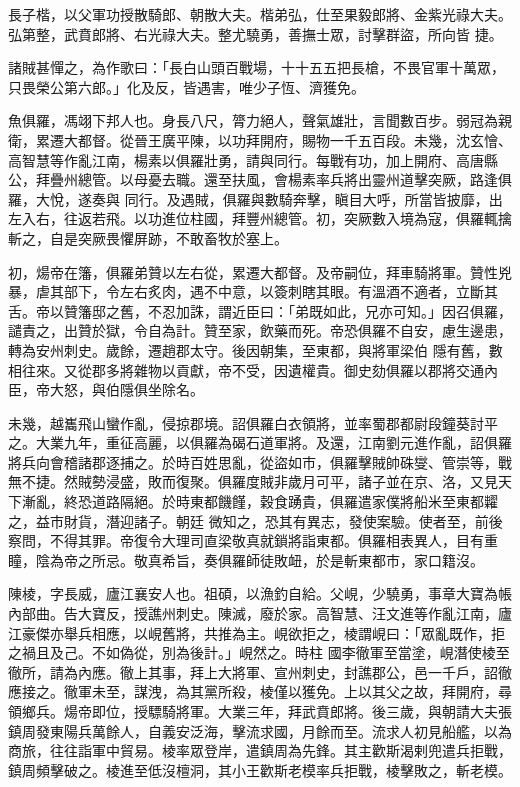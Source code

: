 \begin{pinyinscope}
 長子楷，以父軍功授散騎郎、朝散大夫。楷弟弘，仕至果毅郎將、金紫光祿大夫。弘第整，武賁郎將、右光祿大夫。整尤驍勇，善撫士眾，討擊群盜，所向皆
 捷。



 諸賊甚憚之，為作歌曰：「長白山頭百戰場，十十五五把長槍，不畏官軍十萬眾，只畏榮公第六郎。」化及反，皆遇害，唯少子恆、濟獲免。



 魚俱羅，馮翊下邦人也。身長八尺，膂力絕人，聲氣雄壯，言聞數百步。弱冠為親衛，累遷大都督。從晉王廣平陳，以功拜開府，賜物一千五百段。未幾，沈玄懀、高智慧等作亂江南，楊素以俱羅壯勇，請與同行。每戰有功，加上開府、高唐縣公，拜疊州總管。以母憂去職。還至扶風，會楊素率兵將出靈州道擊突厥，路逢俱羅，大悅，遂奏與
 同行。及遇賊，俱羅與數騎奔擊，瞋目大呼，所當皆披靡，出左入右，往返若飛。以功進位柱國，拜豐州總管。初，突厥數入境為寇，俱羅輒擒斬之，自是突厥畏懼屏跡，不敢畜牧於塞上。



 初，煬帝在籓，俱羅弟贊以左右從，累遷大都督。及帝嗣位，拜車騎將軍。贊性兇暴，虐其部下，令左右炙肉，遇不中意，以簽刺瞎其眼。有溫酒不適者，立斷其舌。帝以贊籓邸之舊，不忍加誅，謂近臣曰：「弟既如此，兄亦可知。」因召俱羅，譴責之，出贊於獄，令自為計。贊至家，飲藥而死。帝恐俱羅不自安，慮生邊患，轉為安州刺史。歲餘，遷趙郡太守。後因朝集，至東都，與將軍梁伯
 隱有舊，數相往來。又從郡多將雜物以貢獻，帝不受，因遺權貴。御史劾俱羅以郡將交通內臣，帝大怒，與伯隱俱坐除名。



 未幾，越巂飛山蠻作亂，侵掠郡境。詔俱羅白衣領將，並率蜀郡都尉段鐘葵討平之。大業九年，重征高麗，以俱羅為碣石道軍將。及還，江南劉元進作亂，詔俱羅將兵向會稽諸郡逐捕之。於時百姓思亂，從盜如市，俱羅擊賊帥硃燮、管崇等，戰無不捷。然賊勢浸盛，敗而復聚。俱羅度賊非歲月可平，諸子並在京、洛，又見天下漸亂，終恐道路隔絕。於時東都饑饉，穀食踴貴，俱羅遣家僕將船米至東都糶之，益市財貨，潛迎諸子。朝廷
 微知之，恐其有異志，發使案驗。使者至，前後察問，不得其罪。帝復令大理司直梁敬真就鎖將詣東都。俱羅相表異人，目有重瞳，陰為帝之所忌。敬真希旨，奏俱羅師徒敗衄，於是斬東都市，家口籍沒。



 陳棱，字長威，廬江襄安人也。祖碩，以漁釣自給。父峴，少驍勇，事章大寶為帳內部曲。告大寶反，授譙州刺史。陳滅，廢於家。高智慧、汪文進等作亂江南，廬江豪傑亦舉兵相應，以峴舊將，共推為主。峴欲拒之，棱謂峴曰：「眾亂既作，拒之禍且及己。不如偽從，別為後計。」峴然之。時柱
 國李徹軍至當塗，峴潛使棱至徹所，請為內應。徹上其事，拜上大將軍、宣州刺史，封譙郡公，邑一千戶，詔徹應接之。徹軍未至，謀洩，為其黨所殺，棱僅以獲免。上以其父之故，拜開府，尋領鄉兵。煬帝即位，授驃騎將軍。大業三年，拜武賁郎將。後三歲，與朝請大夫張鎮周發東陽兵萬餘人，自義安泛海，擊流求國，月餘而至。流求人初見船艦，以為商旅，往往詣軍中貿易。棱率眾登岸，遣鎮周為先鋒。其主歡斯渴剌兜遣兵拒戰，鎮周頻擊破之。棱進至低沒檀洞，其小王歡斯老模率兵拒戰，棱擊敗之，斬老模。




\end{pinyinscope}
